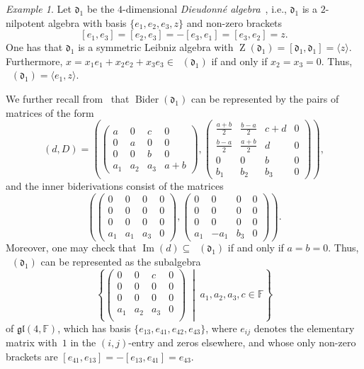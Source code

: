 \documentclass[11pt,a4paper]{amsart}
\theoremstyle{plain}
\theoremstyle{definition}
\theoremstyle{remark}
\newtheorem{example}[subsection]{Example}
\numberwithin{equation}{section}
\newcommand{\0}{\emptyset}
\newcommand{\bF}{\mathbb{F}}
\DeclareMathOperator{\Imm}{Im}
\DeclareMathOperator{\DerL}{Der_{Lie}}
\DeclareMathOperator{\Bider}{Bider}
\DeclareMathOperator{\Z}{Z}
\DeclareMathOperator{\ZL}{Z_{Lie}}
\begin{document}
\begin{example}\label{ex_d1}
Let $\mathfrak{d}_1$ be the $4$-dimensional \emph{Dieudonné algebra}~\cite{LaRosaMancini1}, i.e., $\mathfrak{d}_1$ is a $2$-nilpotent algebra with basis $\lbrace e_1,e_2,e_3,z \rbrace$ and non-zero brackets
\[
[e_1,e_3]=[e_2,e_3]=-[e_3,e_1]=[e_3,e_2]=z.
\]
One has that $\mathfrak{d}_1$ is a symmetric Leibniz algebra with $\Z(\mathfrak{d}_1)=[\mathfrak{d}_1,\mathfrak{d}_1]=\langle z \rangle$. Furthermore, $x=x_1 e_1 + x_2 e_2 + x_3 e_3 \in \ZL(\mathfrak{d}_1)$ if and only if $x_2=x_3=0$. Thus, $\ZL(\mathfrak{d_1})=\langle e_1, z \rangle$.
	
We further recall from~\cite{LaRosaMancini2, ManciniBider} that $\Bider(\mathfrak{d}_1)$ can be represented by the pairs of matrices of the form
\[
(d,D)=\left( \begin{pmatrix}
a & 0 & c & 0 \\
0 & a & 0 & 0 \\
0 & 0 & b & 0 \\
a_1 & a_2 & a_3 & a+b
\end{pmatrix},\begin{pmatrix}
\frac{a+b}{2} & \frac{b-a}{2} & c+d & 0 \\
\frac{b-a}{2} & \frac{a+b}{2} & d & 0 \\
0 & 0 & b & 0 \\
b_1 & b_2 & b_3 & 0
\end{pmatrix} \right),
\]
and the inner biderivations consist of the matrices
\[
\left( \begin{pmatrix}
0 & 0 & 0 & 0 \\
0 & 0 & 0 & 0 \\
0 & 0 & 0 & 0 \\
a_1 & a_1 & a_3 & 0
\end{pmatrix},\begin{pmatrix}
0 & 0 & 0 & 0 \\
0 & 0 & 0 & 0 \\
0 & 0 & 0 & 0 \\
a_1 & -a_1 & b_3 & 0
\end{pmatrix} \right).
\]
Moreover, one may check that $\Imm(d) \subseteq \ZL(\mathfrak{d}_1)$ if and only if $a=b=0$. Thus, $\DerL(\mathfrak{d}_1)$ can be represented as the subalgebra
\[
\left\lbrace \begin{pmatrix}
0 & 0 & c & 0 \\
0 & 0 & 0 & 0 \\
0 & 0 & 0 & 0 \\
a_1 & a_2 & a_3 & 0 \\
\end{pmatrix} \; \middle| \; a_1,a_2,a_3,c \in \bF \right\rbrace
\]
of $\mathfrak{gl}(4,\bF)$, which has basis $\lbrace e_{13},e_{41},e_{42},e_{43} \rbrace$, where $e_{ij}$ denotes the elementary matrix with~$1$ in the $(i,j)$-entry and zeros elsewhere, and whose only non-zero brackets are $[e_{41},e_{13}]=-[e_{13},e_{41}]=e_{43}$. 
	

\end{example}
\end{document}

